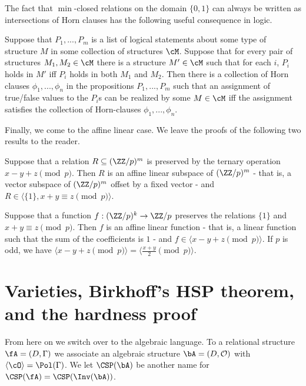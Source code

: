\begin{rem} The fact that $\min$-closed relations on the domain $\{0,1\}$ can always be written as intersections of Horn clauses has the following useful consequence in logic.

Suppose that $P_1, ..., P_m$ is a list of logical statements about some type of structure $M$ in some collection of structures $\cM$. Suppose that for every pair of structures $M_1, M_2 \in \cM$ there is a structure $M' \in \cM$ such that for each $i$, $P_i$ holds in $M'$ iff $P_i$ holds in both $M_1$ and $M_2$. Then there is a collection of Horn clauses $\phi_1, ..., \phi_n$ in the propositions $P_1, ..., P_m$ such that an assignment of true/false values to the $P_i$s can be realized by some $M \in \cM$ iff the assignment satisfies the collection of Horn-clauses $\phi_1, ..., \phi_n$.
\end{rem}

Finally, we come to the affine linear case. We leave the proofs of the following two results to the reader.

\begin{thm} Suppose that a relation $R \subseteq (\ZZ/p)^m$ is preserved by the ternary operation $x - y + z \pmod{p}$. Then $R$ is an affine linear subspace of $(\ZZ/p)^m$ - that is, a vector subspace of $(\ZZ/p)^m$ offset by a fixed vector - and $R \in \langle \{1\}, x+y\equiv z\pmod{p}\rangle$.
\end{thm}

\begin{thm} Suppose that a function $f : (\ZZ/p)^k \rightarrow \ZZ/p$ preserves the relations $\{1\}$ and $x+y \equiv z \pmod{p}$. Then $f$ is an affine linear function - that is, a linear function such that the sum of the coefficients is $1$ - and $f \in \langle x-y+z \pmod{p} \rangle$. If $p$ is odd, we have $\langle x-y+z \pmod{p} \rangle = \langle \frac{x+y}{2} \pmod{p} \rangle$.
\end{thm}


\section{Varieties, Birkhoff's HSP theorem, and the hardness proof}

From here on we switch over to the algebraic language. To a relational structure $\fA = (D, \Gamma)$ we associate an algebraic structure $\bA = (D, \mathcal{O})$ with $\langle \cO \rangle = \Pol(\Gamma)$. We let $\CSP(\bA)$ be another name for $\CSP(\fA) = \CSP(\Inv(\bA))$.


